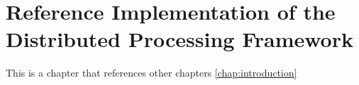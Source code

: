 \chapter{Reference Implementation of the Distributed Processing Framework}
\label{chap:referenceimplementation}

This is a chapter that references other chapters \ref{chap:introduction}
